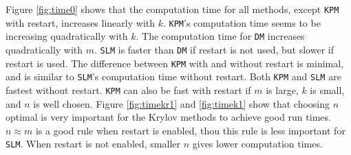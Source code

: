 \noindent Figure \ref{fig:time0} shows that the computation time for all methods, except \texttt{KPM} with restart, increases linearly with $k$. \texttt{KPM}'s computation time seems to be increasing quadratically with $k$. The computation time for \texttt{DM} increases quadratically with $m$. \texttt{SLM} is faster than \texttt{DM} if restart is not used, but slower if restart is used. The difference between \texttt{KPM} with and without restart is minimal, and is similar to \texttt{SLM}'s computation time without restart.  Both \texttt{KPM} and \texttt{SLM} are fastest without restart. \texttt{KPM} can also be fast with restart if $m$ is large, $k$ is small, and $n$ is well chosen. Figure \ref{fig:timekr1} and \ref{fig:timek1} show that choosing $n$ optimal is very important for the Krylov methods to achieve good run times. $n \approx m$ is a good rule when restart is enabled, thou this rule is less important for \texttt{SLM}. When restart is not enabled, smaller $n$ gives lower computation times. 

